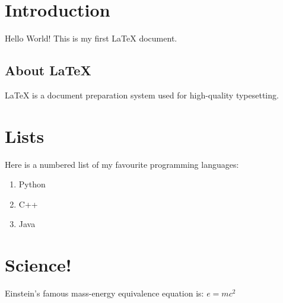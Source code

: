 ﻿\documentclass[12pt, a4paper]{article}
\begin{document}
\tableofcontents

\section{Introduction}
Hello World! This is my first \LaTeX{} document.

\subsection{About LaTeX}
\LaTeX{} is a document preparation system used for high-quality typesetting.

\section{Lists}
Here is a numbered list of my favourite programming languages:
\begin{enumerate}
    \item Python
    \item C++
    \item Java
\end{enumerate}

\section{Science!}
Einstein's famous mass-energy equivalence equation is: $e = mc^2$
\end{document}
